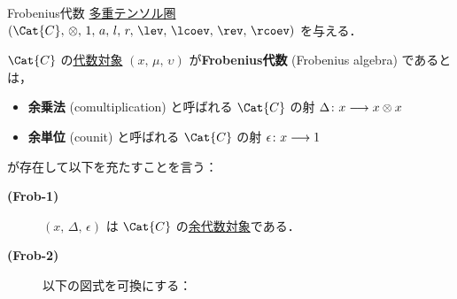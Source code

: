 \documentclass[TQFT_main]{subfiles}
\begin{document}
\begin{mydef}[label=def:Frobenius-alg]{Frobenius代数}
    \hyperref[def:tensorfusion-cat]{多重テンソル圏} $(\Cat{C},\, \otimes,\, 1,\, a,\, l,\,r,\, \lev,\, \lcoev,\, \rev,\, \rcoev)$ を与える．

    $\Cat{C}$ の\hyperref[def:algobj]{代数対象} $(x,\, \mu,\, \upsilon)$ が\textbf{Frobenius代数} (Frobenius algebra) であるとは，
    \begin{itemize}
        \item \textbf{余乗法} (comultiplication) と呼ばれる $\Cat{C}$ の射 $\Delta \colon x \longrightarrow x \otimes x$
        \item \textbf{余単位} (counit) と呼ばれる $\Cat{C}$ の射 $\epsilon \colon x \longrightarrow 1$
    \end{itemize}
    が存在して以下を充たすことを言う：
    \begin{description}
        \item[\textbf{(Frob-1)}] $(x,\, \Delta,\, \epsilon)$ は $\Cat{C}$ の\hyperref[def:algobj]{余代数対象}である．
        \item[\textbf{(Frob-2)}] 以下の図式を可換にする：
        \begin{center}
        \end{center}
    \end{description}
    
\end{mydef}
\end{document}
